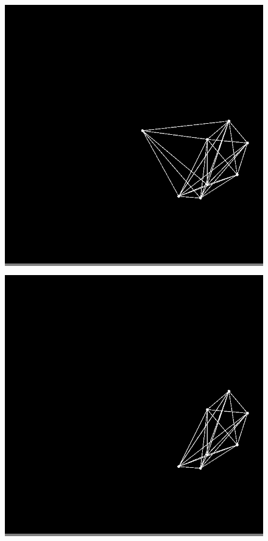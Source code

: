 \documentclass{article}
\begin{document}
\begin{figure}
\begin{minipage}{0.2\textwidth}
            \end{minipage}
            \vskip 0.1in
            \begin{minipage}{0.2\textwidth}
            \colorbox{gray}{\includegraphics[width=\linewidth]{./images/slvo-12.png}}
            \end{minipage}
            \hspace{\fill}
            \begin{minipage}{0.2\textwidth}
            \colorbox{gray}{\includegraphics[width=\linewidth]{./images/slvo-13.png}}

\end{minipage}
\end{figure}
\end{document}
